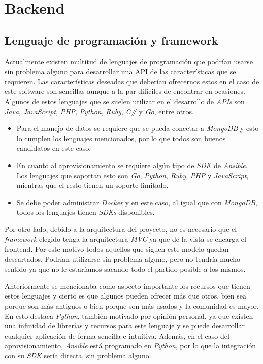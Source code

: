 \section{Backend}

\subsection{Lenguaje de programación y framework}

Actualmente existen multitud de lenguajes de programación que podrían usarse sin problema alguno para desarrollar una API de las características que se requieren. Las características deseadas que deberían ofrecernos estos en el caso de este software son sencillas aunque a la par difíciles de encontrar en ocasiones. Algunos de estos lenguajes que se suelen utilizar en el desarrollo de \textit{APIs} son \textit{Java}, \textit{JavaScript}, \textit{PHP}, \textit{Python}, \textit{Ruby}, \textit{C\#} y \textit{Go}, entre otros.

\begin{itemize}
	\item Para el manejo de datos se requiere que se pueda conectar a \textit{MongoDB} y esto lo cumplen los lenguajes mencionados, por lo que todos son buenos candidatos en este caso.
	\item En cuanto al aprovisionamiento se requiere algún tipo de \textit{SDK} de \textit{Ansible}. Los lenguajes que soportan esto son \textit{Go}, \textit{Python}, \textit{Ruby}, \textit{PHP} y \textit{JavaScript}, mientras que el resto tienen un soporte limitado.
	\item Se debe poder administrar \textit{Docker} y en este caso, al igual que con \textit{MongoDB}, todos los lenguajes tienen \textit{SDKs} disponibles.
\end{itemize}

Por otro lado, debido a la arquitectura del proyecto, no es necesario que el \textit{framework} elegido tenga la arquitectura \textit{MVC} ya que de la vista se encarga el frontend. Por este motivo todos aquellos que siguen este modelo quedan descartados. Podrían utilizarse sin problema alguno, pero no tendría mucho sentido ya que no le estaríamos sacando todo el partido posible a los mismos.

Anteriormente se mencionaba como aspecto importante los recursos que tienen estos lenguajes y cierto es que algunos pueden ofrecer más que otros, bien sea porque son más antiguos o bien porque son más usados y la comunidad es mayor. En esto destaca \textit{Python}, también motivado por opinión personal, ya que existen una infinidad de librerías y recursos para este lenguaje y se puede desarrollar cualquier aplicación de forma sencilla e intuitiva. Además, en el caso del aprovisionamiento, \textit{Ansible} está programado en \textit{Python}, por lo que la integración con su \textit{SDK} sería directa, sin problema alguno.

